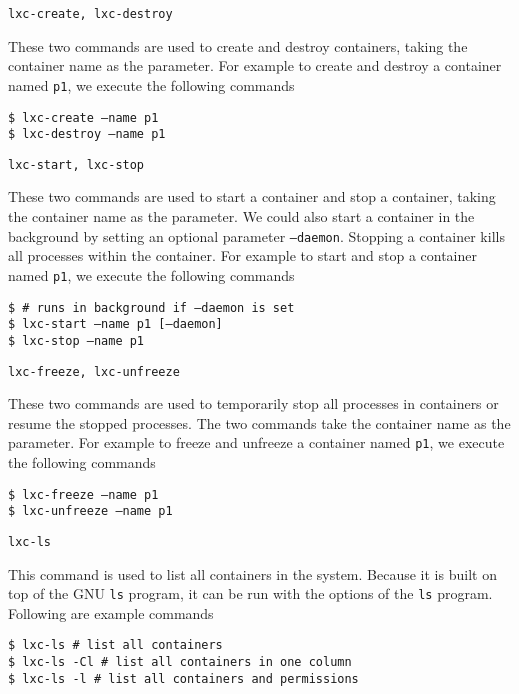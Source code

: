 \documentclass[12pt]{article}
\begin{document}
{\parindent0pt %

\texttt{lxc-create, lxc-destroy}
\begin{dent}
These two commands are used to create and destroy containers, taking the container name as the parameter. For example to create and destroy a container named \texttt{p1}, we execute the following commands

\texttt{\$ lxc-create --name p1}\\
\texttt{\$ lxc-destroy --name p1}
\end{dent}


\texttt{lxc-start, lxc-stop}
\begin{dent}
These two commands are used to start a container and stop a container, taking the container name as the parameter. We could also start a container in the background by setting an optional parameter \texttt{--daemon}. Stopping a container kills all processes within the container. For example to start and stop a container named \texttt{p1}, we execute the following commands

\texttt{\$ \# runs in background if --daemon is set}\\
\texttt{\$ lxc-start --name p1 [--daemon]}\\
\texttt{\$ lxc-stop --name p1}
\end{dent}


\texttt{lxc-freeze, lxc-unfreeze}
\begin{dent}
These two commands are used to temporarily stop all processes in containers or resume the stopped processes. The two commands take the container name as the parameter. For example to freeze and unfreeze a container named \texttt{p1}, we execute the following commands

\texttt{\$ lxc-freeze --name p1}\\
\texttt{\$ lxc-unfreeze --name p1}
\end{dent}


\texttt{lxc-ls}
\begin{dent}
This command is used to list all containers in the system. Because it is built on top of the GNU \texttt{ls} program, it can be run with the options of the \texttt{ls} program. Following are example commands

\texttt{\$ lxc-ls \# list all containers}\\
\texttt{\$ lxc-ls -Cl \# list all containers in one column}\\
\texttt{\$ lxc-ls -l \# list all containers and permissions}
\end{dent}


}
\end{document}
